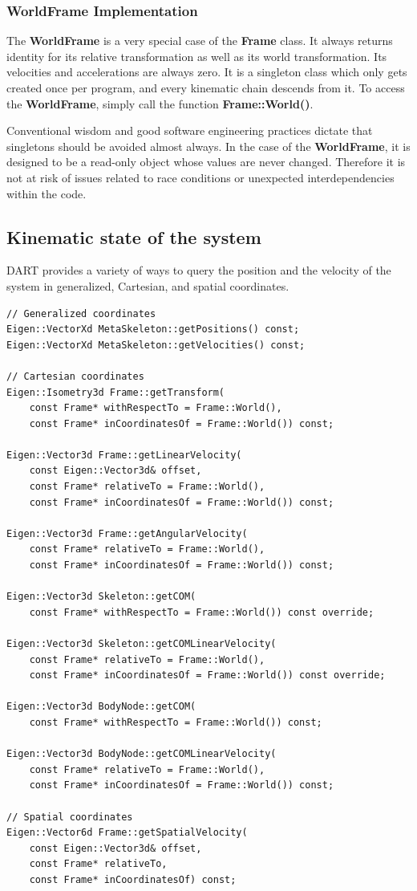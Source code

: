 \subsubsection{WorldFrame Implementation}

The \textbf{WorldFrame} is a very special case of the \textbf{Frame} class. It always returns identity for its relative transformation as well as its world transformation. Its velocities and accelerations are always zero. It is a singleton class which only gets created once per program, and every kinematic chain descends from it. To access the \textbf{WorldFrame}, simply call the function \textbf{Frame::World()}.

Conventional wisdom and good software engineering practices dictate that singletons should be avoided almost always. In the case of the \textbf{WorldFrame}, it is designed to be a read-only object whose values are never changed. Therefore it is not at risk of issues related to race conditions or unexpected interdependencies within the code.

\subsection{Kinematic state of the system}
DART provides a variety of ways to query the position and the velocity of the system in generalized, Cartesian, and spatial coordinates. 

\begin{lstlisting}
// Generalized coordinates
Eigen::VectorXd MetaSkeleton::getPositions() const;
Eigen::VectorXd MetaSkeleton::getVelocities() const;

// Cartesian coordinates
Eigen::Isometry3d Frame::getTransform(
    const Frame* withRespectTo = Frame::World(), 
    const Frame* inCoordinatesOf = Frame::World()) const;
    
Eigen::Vector3d Frame::getLinearVelocity(
    const Eigen::Vector3d& offset, 
    const Frame* relativeTo = Frame::World(), 
    const Frame* inCoordinatesOf = Frame::World()) const;
    
Eigen::Vector3d Frame::getAngularVelocity(
    const Frame* relativeTo = Frame::World(), 
    const Frame* inCoordinatesOf = Frame::World()) const;
    
Eigen::Vector3d Skeleton::getCOM(
    const Frame* withRespectTo = Frame::World()) const override;
    
Eigen::Vector3d Skeleton::getCOMLinearVelocity(
    const Frame* relativeTo = Frame::World(), 
    const Frame* inCoordinatesOf = Frame::World()) const override;
    
Eigen::Vector3d BodyNode::getCOM(
    const Frame* withRespectTo = Frame::World()) const;
    
Eigen::Vector3d BodyNode::getCOMLinearVelocity(
    const Frame* relativeTo = Frame::World(), 
    const Frame* inCoordinatesOf = Frame::World()) const;

// Spatial coordinates
Eigen::Vector6d Frame::getSpatialVelocity(
    const Eigen::Vector3d& offset, 
    const Frame* relativeTo, 
    const Frame* inCoordinatesOf) const;
\end{lstlisting}

